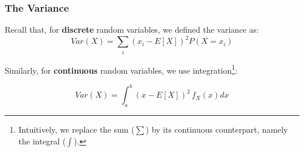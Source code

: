 \documentclass[notes=show,smaller,handout]{beamer}\usepackage[]{graphicx}\usepackage[]{color}
\renewcommand{\Pr}{P}
\begin{document}
\begin{frame}%
\frametitle{The Variance}

Recall that, for \textbf{discrete} random variables, we defined the variance as: \vspace{0.5cm}
\begin{equation*}
Var\left( X\right) =\sum_{i}\left( x_{i}-E\left[ X\right] \right) ^{2}\Pr
\left( X=x_{i}\right)
\end{equation*}

\vspace{1cm}

Similarly, for \textbf{continuous} random variables, we use integration\footnote{Intuitively, we replace the sum ($\sum$) by its continuous counterpart, namely the integral ($\int$). }:
\vspace{0.5cm}

\begin{equation*}
Var\left( X\right) =\int_{a}^{b}\left( x-E\left[ X\right] \right)
^{2}\,f_{X}\left( x\right) dx
\end{equation*}

\end{frame}%

%
%
%
%
%
%
%
\end{document}
